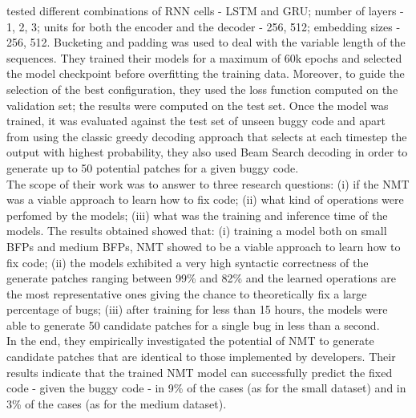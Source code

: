 tested different combinations of RNN cells - LSTM and GRU; number of layers - 1, 2, 3; units for both the encoder
and the decoder - 256, 512; embedding sizes - 256, 512.
Bucketing and padding was used to deal with the variable length of the sequences.
They trained their models for a maximum of 60k epochs and selected the model checkpoint before 
overfitting the training data. Moreover, to guide the selection of the best configuration, they 
used the loss function computed on the validation set; the results were computed on the test set.
Once the model was trained, it was evaluated against the test set of unseen buggy code and apart from using the classic
greedy decoding approach that selects at each timestep the output with highest probability, they also used Beam Search decoding
in order to generate up to 50 potential patches for a given buggy code.\\
\newline
The scope of their work was to answer to three research questions: (i) if the NMT was a viable approach 
to learn how to fix code; (ii) what kind of operations were perfomed by the models; (iii) what was the training 
and inference time of the models. The results obtained showed that: (i) training a model both on small BFPs and medium
BFPs, NMT showed to be a viable approach to learn how to fix code; (ii) the models exhibited a very high syntactic 
correctness of the generate patches ranging between 99\% and 82\% and the learned operations are the most representative ones 
giving the chance to theoretically fix a large percentage of bugs; (iii) after training for less than 15 hours,
the models were able to generate 50 candidate patches for a single bug in less than a second.\\
\newline
In the end, they empirically investigated the potential of NMT to generate
candidate patches that are identical to those implemented by developers. Their results indicate 
that the trained NMT model can successfully predict the fixed code - given the buggy code - in 9\% of the cases (as for the small dataset) and in 
3\% of the cases (as for the medium dataset).


